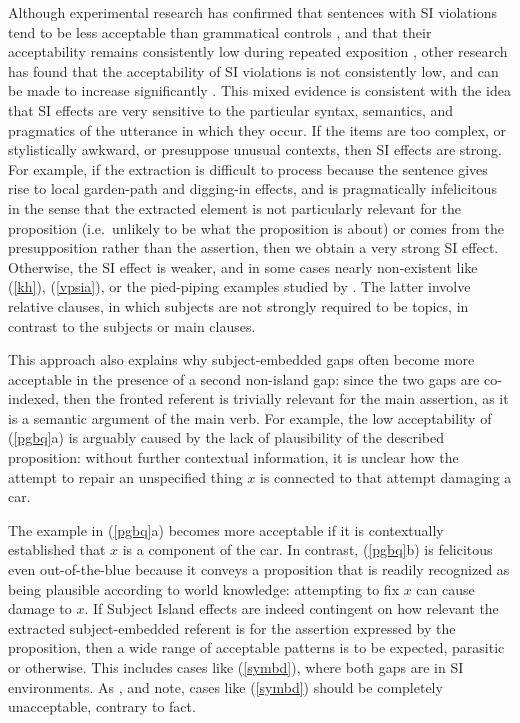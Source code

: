 \documentclass[output=paper
 	        ,biblatex
                ,babelshorthands
                ,newtxmath
                ,draftmode
                ,colorlinks, citecolor=brown
]{langscibook}
\begin{document}
Although experimental research has confirmed that sentences with SI violations tend to be less acceptable than grammatical controls \citep{sprsat2,goodall11,crawfordwccfl,clausencuny,greco}, and that their acceptability
remains consistently low during repeated exposition  \citep{sprsat2,crawfordwccfl}, other research has found that the acceptability of  SI violations is not consistently low, and can be made to increase significantly \citep{hiramatsu00,clausencuny,chavesjeruen,chavessubjexp}. This mixed evidence is consistent with the idea that SI effects are very sensitive to the particular syntax, semantics, and pragmatics of the utterance in which they occur. If the items are too complex, or stylistically awkward, or presuppose unusual contexts, then  
SI effects are  strong.  For example, if the extraction is difficult to process because the sentence gives rise to local  garden-path and digging-in effects, and is pragmatically infelicitous in the sense that the extracted element is not particularly relevant for the proposition (i.e.\ unlikely to be what the proposition is about) or comes from the presupposition rather than the assertion, then we obtain a very strong SI effect. Otherwise, the SI effect is weaker, and in some cases nearly non-existent like (\ref{kh}), (\ref{vpsia}), or 
 the  pied-piping examples studied by \citet{annerels}. The latter involve relative clauses, in which subjects are not strongly required to be topics, in contrast to the subjects or main clauses.

This approach also explains why subject-embedded gaps often become more acceptable in the presence of a second non-island gap: since the two gaps are co-indexed, then the fronted referent is trivially relevant for the main assertion, as it is a semantic argument
of the main verb. For example, the low acceptability of (\ref{pgbq}a) is arguably caused  by the lack of   plausibility of the described proposition: without further contextual information, it is unclear how the attempt to repair  an unspecified thing $x$ is connected to that attempt damaging  a car. 


\eal   \label{pgbq}
\zl


\noindent
The example in  (\ref{pgbq}a)  becomes more acceptable if it is contextually  established that $x$ is  a component of the car. In contrast, (\ref{pgbq}b) is felicitous even out-of-the-blue because it  conveys a  proposition  that is  readily recognized as being plausible according to world knowledge: attempting to fix $x$ can cause  damage to $x$.  If Subject Island effects are indeed contingent on how relevant the extracted subject-embedded referent is for the assertion expressed by the proposition, then a wide range of acceptable  patterns is to be expected, parasitic or otherwise. This includes cases like  (\ref{symbd}), where both gaps are in SI environments. As \citet{Levine:Sag:03}, \citet[256]{levhubook}  and \citet[161]{Culicover13} note, cases like (\ref{symbd}) should be completely unacceptable, contrary to fact.
\end{document}
